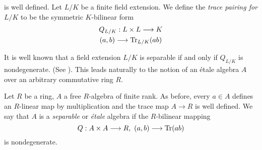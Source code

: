 is well defined. Let $L/K$ be a finite field extension. We define the \textit{trace pairing for $L/K$} to be the symmetric $K$-bilinear form
\begin{gather*}
	Q_{L/K} : L \times L \longrightarrow K\\
	(a,b) \longrightarrow \operatorname{Tr}_{L/K}(ab)
\end{gather*}

It is well known that a field extension $L/K$ is separable if and only if $Q_{L/K}$ is nondegenerate. (See \cite{konradSep}). This leads naturally to the notion of an \'etale algebra $A$ over an arbitrary commutative ring $R$.

\begin{definition}
	Let $R$ be a ring, $A$ a free $R$-algebra of finite rank. As before, every $a \in A$ defines an $R$-linear map by multiplication and the trace map $A \to R$ is well defined. We say that $A$ is a \textit{separable} or \textit{\'etale} algebra if the $R$-bilinear mapping
	\[
		Q : A \times A \longrightarrow R,\ (a,b) \longrightarrow \operatorname{Tr}(ab)
	\]
	is nondegenerate.
\end{definition}
